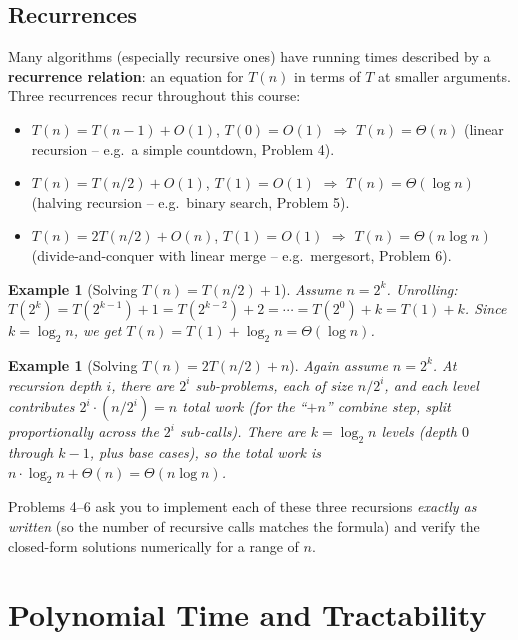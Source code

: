 \documentclass[11pt]{article}
\newtheorem{example}[theorem]{Example}
\begin{document}
\subsection{Recurrences}

Many algorithms (especially recursive ones) have running times described by a
\textbf{recurrence relation}: an equation for $T(n)$ in terms of $T$ at smaller arguments.
Three recurrences recur throughout this course:

\begin{itemize}
    \item $T(n) = T(n-1) + O(1)$, $T(0) = O(1)$ $\Rightarrow$ $T(n) = \Theta(n)$ (linear
    recursion -- e.g.\ a simple countdown, Problem 4).
    \item $T(n) = T(n/2) + O(1)$, $T(1) = O(1)$ $\Rightarrow$ $T(n) = \Theta(\log n)$
    (halving recursion -- e.g.\ binary search, Problem 5).
    \item $T(n) = 2T(n/2) + O(n)$, $T(1) = O(1)$ $\Rightarrow$ $T(n) = \Theta(n \log n)$
    (divide-and-conquer with linear merge -- e.g.\ mergesort, Problem 6).
\end{itemize}

\begin{example}[Solving $T(n) = T(n/2) + 1$]
Assume $n = 2^k$. Unrolling: $T(2^k) = T(2^{k-1}) + 1 = T(2^{k-2}) + 2 = \cdots = T(2^0) + k
= T(1) + k$. Since $k = \log_2 n$, we get $T(n) = T(1) + \log_2 n = \Theta(\log n)$.
\end{example}

\begin{example}[Solving $T(n) = 2T(n/2) + n$]
Again assume $n = 2^k$. At recursion depth $i$, there are $2^i$ sub-problems, each of size
$n/2^i$, and each level contributes $2^i \cdot (n/2^i) = n$ total work (for the ``$+n$''
combine step, split proportionally across the $2^i$ sub-calls). There are $k = \log_2 n$
levels (depth $0$ through $k-1$, plus base cases), so the total work is
$n \cdot \log_2 n + \Theta(n) = \Theta(n \log n)$.
\end{example}

Problems 4--6 ask you to implement each of these three recursions \emph{exactly as
written} (so the number of recursive calls matches the formula) and verify the closed-form
solutions numerically for a range of $n$.

\section{Polynomial Time and Tractability}
\end{document}
